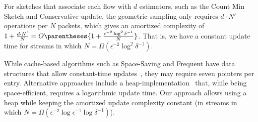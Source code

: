 For sketches that associate each flow with $d$ estimators, such as the Count Min Sketch and Conservative update,
the geometric sampling  only requires $d\cdot N'$ operations per $N$ packets, which gives an amortized complexity of $1+\frac{d\cdot N'}{N}=O\parentheses{1+\frac{\epsilon^{-2}\log^2\delta^{-1}}{N}}$. That is, we have a constant update time for streams in which $N=\Omega(\epsilon^{-2}\log^2\delta^{-1})$.

While cache-based algorithms such as Space-Saving and Frequent have data structures that allow constant-time updates~\cite{CormodeCode}, they may require seven pointers per entry. %
Alternative approaches include a heap-implementation~\cite{CormodeCode} that, while being space-efficient, requires a logarithmic update time.
Our approach allows using a heap while keeping the amortized update complexity constant (in streams in which $N=\Omega(\epsilon^{-2}\log\epsilon^{-1}\log\delta^{-1})$). 











